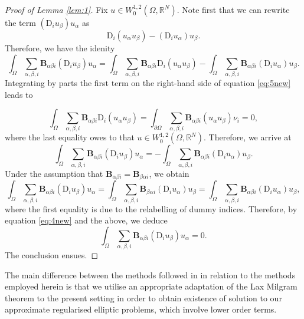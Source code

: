 \documentclass{amsart}
\numberwithin{equation}{section}
\numberwithin{thm}{section}
\theoremstyle{definition}
\renewcommand{\:}{\!:\!} %
\renewcommand{\^}[1]{^{#1}_{\phantom{l}}}
\begin{document}
\begin{proof}[Proof of Lemma \ref{lem:1}]
Fix $u \in W^{1,2}_0(\Omega, \mathbb{R}^N)$. Note first that we can rewrite the term $(\mathrm{D}_i u_\beta)u_\alpha$ as 
\[
\mathrm{D}_i(u_\alpha u_\beta) - (\mathrm{D}_i u_\alpha)u_\beta. 
\]
Therefore, we have the idenity
\begin{equation}\label{eq:5new}
\int_{\Omega} \sum_{\alpha, \beta, i}\mathbf{B}_{\alpha \beta i} (\mathrm{D}_i u_{\beta}) u_{\alpha} = \int_{\Omega} \sum_{\alpha, \beta, i}\mathbf{B}_{\alpha \beta i} \mathrm{D}_i(u_{\alpha} u_{\beta}) - \int_{\Omega} \sum_{\alpha, \beta, i}\mathbf{B}_{\alpha \beta i} (\mathrm{D}_i u_{\alpha}) u_{\beta}.
\end{equation}
Integrating by parts the first term on the right-hand side of equation \eqref{eq:5new} leads to

\begin{equation}
\int_{\Omega} \sum_{\alpha, \beta, i}\mathbf{B}_{\alpha \beta i} \mathrm{D}_i(u_{\alpha} u_{\beta}) = \int_{\partial \Omega} \sum_{\alpha, \beta, i}\mathbf{B}_{\alpha \beta i}(u_{\alpha} u_{\beta})\nu_i = 0,
\end{equation}
where the last equality owes to that $u \in W^{1,2}_0(\Omega, \mathbb{R}^N)$. Therefore, we arrive at
\begin{equation} \label{eq:4new}
\int_{\Omega} \sum_{\alpha, \beta, i}\mathbf{B}_{\alpha \beta i} (\mathrm{D}_i u_{\beta}) u_{\alpha} = - \int_{\Omega} \sum_{\alpha, \beta, i}\mathbf{B}_{\alpha \beta i} (\mathrm{D}_i u_{\alpha}) u_{\beta}.
\end{equation}
Under the assumption that $\mathbf{B}_{\alpha \beta i} = \mathbf{B}_{\beta \alpha i}$, we obtain
\[
\int_{\Omega} \sum_{\alpha, \beta, i}\mathbf{B}_{\alpha \beta i} (\mathrm{D}_i u_{\beta}) u_{\alpha} = \int_{\Omega} \sum_{\alpha, \beta, i}\mathbf{B}_{\beta \alpha i} (\mathrm{D}_i u_{\alpha}) u_{\beta}= \int_{\Omega} \sum_{\alpha, \beta, i}\mathbf{B}_{\alpha \beta i} (\mathrm{D}_i u_{\alpha}) u_{\beta},
\]
where the first equality is due to the relabelling of dummy indices. Therefore, by equation \eqref{eq:4new} and the above, we deduce
\begin{equation*}
\int_{\Omega} \sum_{\alpha, \beta, i}\mathbf{B}_{\alpha \beta i} (\mathrm{D}_i u_{\beta}) u_{\alpha} = 0.
\end{equation*}
The conclusion ensues.
\end{proof}

The main difference between the methods followed in \cite{nikos1} in relation to the methods employed herein is that we utilise an appropriate adaptation of the Lax Milgram theorem to the present setting in order to obtain existence of solution to our approximate regularised elliptic problems, which involve lower order terms.
\end{document}
